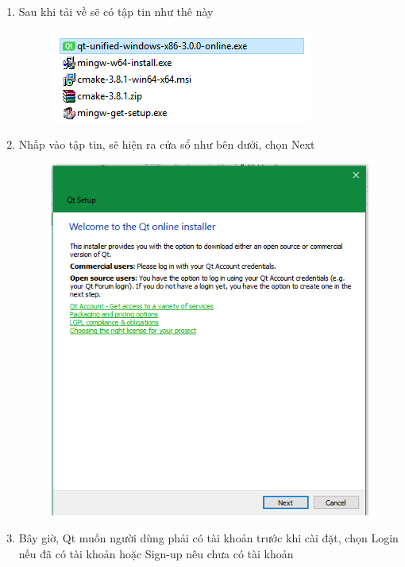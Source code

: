 \documentclass[12pt,a4paper]{report}
\begin{document}
\begin{enumerate}
\begin{figure}[H]
				\end{figure}
				\item Sau khi tải về sẽ có tập tin như thê này
				\begin{figure}[H]
					\centering
					\label{F:qtstep3}
					\includegraphics[scale = 2]{Qtstep3.png}
				\end{figure}
				\item Nhấp vào tập tin, sẽ hiện ra cửa sổ như bên dưới, chọn Next
				\begin{figure}[H]
					\centering
					\label{F:qtstep4}
					\includegraphics[scale = .7]{Qtstep4.png}
				\end{figure}
				\item Bây giờ, Qt muốn người dùng phải có tài khoản trước khi cài đặt, chọn Login nếu đã có tài khoản hoặc Sign-up nêu chưa có tài khoản
				\begin{figure}[H]
					\centering

\end{figure}
\end{enumerate}
\end{document}
